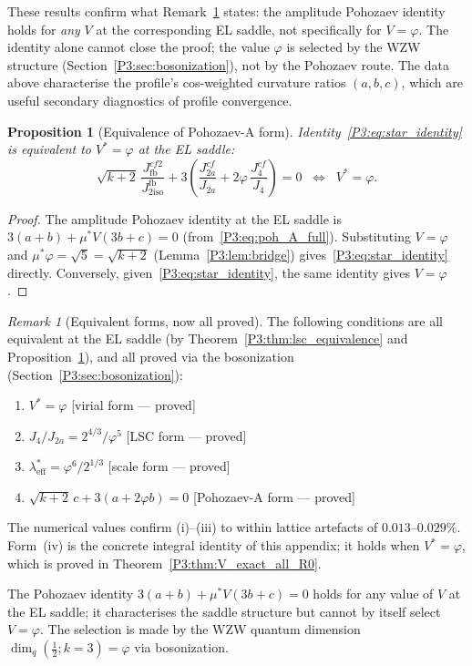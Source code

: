 \documentclass[11pt,a4paper]{article}
\newtheorem{proposition}[theorem]{Proposition}
\theoremstyle{definition}
\theoremstyle{remark}
\newtheorem{remark}[theorem]{Remark}
\newcommand{\vp}{\varphi}
\newcommand{\Jfb}{J_{2\mathrm{iso}}^{\mathrm{fb}}}
\newcommand{\Ja}{J_{2a}}
\newcommand{\Jfour}{J_{4}}
\newcommand{\leff}{\lambda_{\mathrm{eff}}}
\begin{document}
These results confirm what Remark~\ref{P3:rem:five_forms} states: the
amplitude Pohozaev identity holds for \emph{any} $V$ at the corresponding
EL saddle, not specifically for $V = \vp$.  The identity alone cannot
close the proof; the value $\vp$ is selected by the WZW structure
(Section~\ref{P3:sec:bosonization}), not by the Pohozaev route.
The data above characterise the profile's cos-weighted curvature ratios
$(a, b, c)$, which are useful secondary diagnostics of profile convergence.

\begin{proposition}[Equivalence of Pohozaev-A form]
\label{P3:prop:poh_a_equiv}
Identity~\eqref{P3:eq:star_identity} is equivalent to $V^* = \vp$ at the EL saddle:
\begin{equation}
  \sqrt{k+2}\,\frac{J_{\mathrm{fb}}^{cf2}}{\Jfb} + 3\!\left(\frac{J_{2a}^{cf}}{\Ja}
  + 2\vp\,\frac{J_4^{cf}}{\Jfour}\right) = 0
  \;\;\Longleftrightarrow\;\; V^* = \vp.
\end{equation}
\end{proposition}

\begin{proof}
The amplitude Pohozaev identity at the EL saddle is
$3(a+b) + \mu^* V(3b+c) = 0$ (from~\eqref{P3:eq:poh_A_full}).
Substituting $V = \vp$ and $\mu^*\vp = \sqrt{5} = \sqrt{k+2}$ (Lemma~\ref{P3:lem:bridge})
gives~\eqref{P3:eq:star_identity} directly.
Conversely, given~\eqref{P3:eq:star_identity}, the same identity gives $V=\vp$.
\end{proof}

\begin{remark}[Equivalent forms, now all proved]
\label{P3:rem:five_forms}
The following conditions are all equivalent at the EL saddle
(by Theorem~\ref{P3:thm:lsc_equivalence} and Proposition~\ref{P3:prop:poh_a_equiv}),
and all proved via the bosonization (Section~\ref{P3:sec:bosonization}):
\begin{enumerate}[noitemsep,label=(\roman*)]
  \item $V^* = \vp$ \hfill[virial form --- proved]
  \item $J_4/J_{2a} = 2^{4/3}/\vp^5$ \hfill[LSC form --- proved]
  \item $\leff^* = \vp^6/2^{1/3}$ \hfill[scale form --- proved]
  \item $\sqrt{k+2}\,c + 3(a+2\vp b) = 0$ \hfill[Pohozaev-A form --- proved]
\end{enumerate}
The numerical values confirm (i)--(iii) to within lattice artefacts of
$0.013$--$0.029\%$.  Form~(iv) is the concrete integral identity of
this appendix; it holds when $V^*=\vp$, which is proved in
Theorem~\ref{P3:thm:V_exact_all_R0}.

The Pohozaev identity $3(a+b)+\mu^* V(3b+c)=0$ holds for any value
of $V$ at the EL saddle; it characterises the saddle structure but
cannot by itself select $V=\vp$.  The selection is made by the WZW
quantum dimension $\dim_q(\tfrac{1}{2};k{=}3) = \vp$ via bosonization.
\end{remark}


\end{document}
